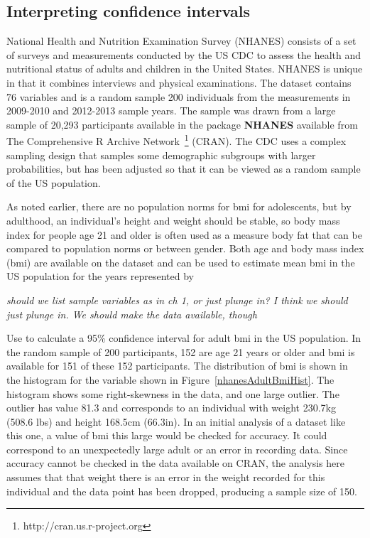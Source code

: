 \begin{spacing}{1.5}
\begin{exercise}
\end{exercise}


\subsection{Interpreting confidence intervals}
\label{interpretingCIs}


National Health and Nutrition Examination Survey (NHANES) consists of a set of surveys and measurements conducted by the US CDC to assess the health and nutritional status of adults and children in the United States. NHANES is unique in that it combines interviews and physical examinations.  The dataset  contains 76 variables and is a random sample 200 individuals from the measurements in 2009-2010 and 2012-2013 sample years.  The sample was drawn from a large sample of 20,293 participants available in the package \textbf{NHANES} available from The Comprehensive R Archive Network~\footnote{http://cran.us.r-project.org} (CRAN).  The CDC uses a complex sampling design that samples some demographic subgroups with larger probabilities, but  has been adjusted so that it can be viewed as a random sample of the US population.  

As noted earlier, there are no population norms for bmi for adolescents, but by adulthood, an  individual's height and weight should be stable, so body mass index for people age 21 and older is often used as a measure body fat that can be compared to population norms or between gender. Both age and body mass index (bmi) are available on the dataset and can be used to estimate mean bmi in the US population for the years represented by 

\textit{should we list sample variables as in ch 1, or just plunge in?  I think we should just plunge in.  We should make the data available, though}

\begin{example}{Use  to calculate a 95\% confidence interval for adult bmi in the US population. \label{exNhanesBmi}}
	In the random sample of 200 participants, 152 are age 21 years or older and bmi is available for 151 of these 152 participants.  The distribution of bmi is shown in the histogram for the variable  shown in Figure~\ref{nhanesAdultBmiHist}.  The histogram shows some right-skewness in the data, and one large outlier.  The outlier has value 81.3 and corresponds to an individual with weight 230.7kg (508.6 lbs) and height 168.5cm (66.3in). In an initial analysis of a dataset like this one, a value of bmi this large would be checked for accuracy. It could correspond to an unexpectedly large adult or an error in recording data.  Since accuracy cannot be checked in the data available on CRAN, the analysis here assumes that that weight there is an error in the weight recorded for this individual and the data point has been dropped, producing a sample size of 150. 
	

\end{example}
\end{spacing}
